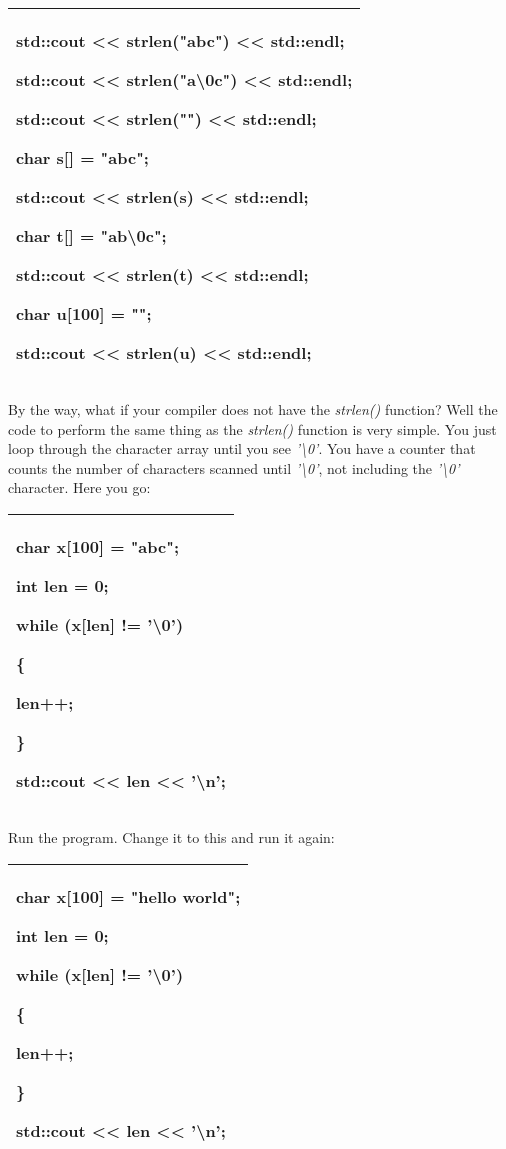 \documentclass[
]{article}
\begin{document}
\begin{longtable}[]{@{}l@{}}
\toprule
\endhead
\begin{minipage}[t]{0.97\columnwidth}\raggedright
std::cout \textless\textless{} strlen("abc") \textless\textless{}
std::endl;

std::cout \textless\textless{} strlen("a\textbackslash0c")
\textless\textless{} std::endl;

std::cout \textless\textless{} strlen("") \textless\textless{}
std::endl;

char s{[}{]} = "abc";

std::cout \textless\textless{} strlen(s) \textless\textless{} std::endl;

char t{[}{]} = "ab\textbackslash0c";

std::cout \textless\textless{} strlen(t) \textless\textless{} std::endl;

char u{[}100{]} = "";

std::cout \textless\textless{} strlen(u) \textless\textless{}
std::endl;\strut
\end{minipage}\tabularnewline
\bottomrule
\end{longtable}

By the way, what if your compiler does not have the \emph{strlen()}
function? Well the code to perform the same thing as the \emph{strlen()}
function is very simple. You just loop through the character array until
you see \emph{'\textbackslash0'}. You have a counter that counts the
number of characters scanned until \emph{'\textbackslash0'}, not
including the \emph{'\textbackslash0'} character. Here you go:

\begin{longtable}[]{@{}l@{}}
\toprule
\endhead
\begin{minipage}[t]{0.97\columnwidth}\raggedright
char x{[}100{]} = "abc";

int len = 0;

while (x{[}len{]} != '\textbackslash0')

\{

len++;

\}

std::cout \textless\textless{} len \textless\textless{}
'\textbackslash n';\strut
\end{minipage}\tabularnewline
\bottomrule
\end{longtable}

Run the program. Change it to this and run it again:

\begin{longtable}[]{@{}l@{}}
\toprule
\endhead
\begin{minipage}[t]{0.97\columnwidth}\raggedright
char x{[}100{]} = "hello world";

int len = 0;

while (x{[}len{]} != '\textbackslash0')

\{

len++;

\}

std::cout \textless\textless{} len \textless\textless{}
'\textbackslash n';\strut
\end{minipage}\tabularnewline
\bottomrule
\end{longtable}
\end{document}
